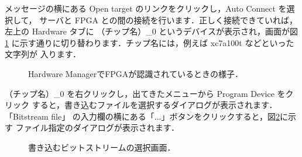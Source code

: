 メッセージの横にある Open target のリンクをクリックし，Auto Connect を選択して，
サーバと FPGA との間の接続を行います．正しく接続できていれば，左上の Hardware
タブに （チップ名）\_0 というデバイスが表示され，画面が図\ref{fig:Vivado1_14} 
に示す通りに切り替わります．チップ名には，例えば xc7a100t などといった文字列が
入ります．

\begin{figure}[H]
 \centering
 \caption{Hardware ManagerでFPGAが認識されているときの様子．}
 \label{fig:Vivado1_14}
\end{figure}

（チップ名）\_0 を右クリックし，出てきたメニューから Program Device をクリック
すると，書き込むファイルを選択するダイアログが表示されます．「Bitstream file」
の入力欄の横にある「...」ボタンをクリックすると，図\ref{fig:Vivado1_15}に示す
ファイル指定のダイアログが表示されます．

\begin{figure}[H]
 \centering
 \caption{書き込むビットストリームの選択画面．}
 \label{fig:Vivado1_15}
\end{figure}

